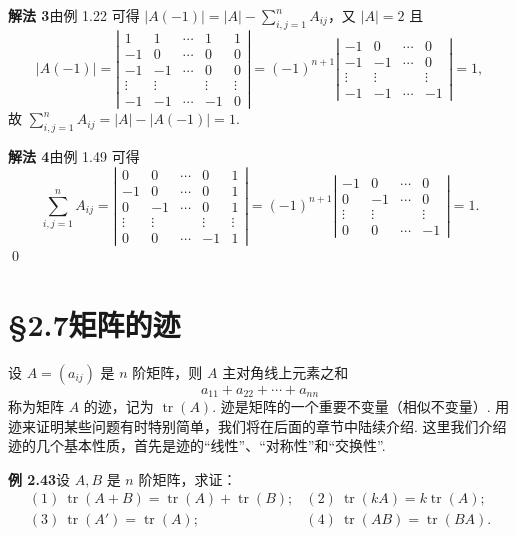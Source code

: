 \documentclass[UTF8,12pt,a4paper,fontset=fandol]{ctexart}
\begin{document}
\noindent\textbf{解法 3}\quad 由例 1.22 可得 $|A(-1)|=|A|-\sum\limits_{i,j=1}^n A_{ij}$，又 $|A|=2$ 且
\[
|A(-1)|=
\left|
\begin{array}{ccccc}
1 & 1 & \cdots & 1 & 1\\
-1 & 0 & \cdots & 0 & 0\\
-1 & -1 & \cdots & 0 & 0\\
\vdots & \vdots & & \vdots & \vdots\\
-1 & -1 & \cdots & -1 & 0
\end{array}
\right|
=(-1)^{n+1}
\left|
\begin{array}{cccc}
-1 & 0 & \cdots & 0\\
-1 & -1 & \cdots & 0\\
\vdots & \vdots & & \vdots\\
-1 & -1 & \cdots & -1
\end{array}
\right|
=1,
\]
故 $\sum\limits_{i,j=1}^n A_{ij}=|A|-|A(-1)|=1$.

\noindent\textbf{解法 4}\quad 由例 1.49 可得
\[
\sum_{i,j=1}^n A_{ij}=
\left|
\begin{array}{ccccc}
0 & 0 & \cdots & 0 & 1\\
-1 & 0 & \cdots & 0 & 1\\
0 & -1 & \cdots & 0 & 1\\
\vdots & \vdots & & \vdots & \vdots\\
0 & 0 & \cdots & -1 & 1
\end{array}
\right|
=(-1)^{n+1}
\left|
\begin{array}{cccc}
-1 & 0 & \cdots & 0\\
0 & -1 & \cdots & 0\\
\vdots & \vdots & & \vdots\\
0 & 0 & \cdots & -1
\end{array}
\right|
=1.
\]
\qed

\section*{§2.7\quad 矩阵的迹}

设 $A=(a_{ij})$ 是 $n$ 阶矩阵，则 $A$ 主对角线上元素之和
\[
a_{11}+a_{22}+\cdots+a_{nn}
\]
称为矩阵 $A$ 的迹，记为 $\operatorname{tr}(A)$. 迹是矩阵的一个重要不变量（相似不变量）. 用迹来证明某些问题有时特别简单，我们将在后面的章节中陆续介绍. 这里我们介绍迹的几个基本性质，首先是迹的“线性”、“对称性”和“交换性”.

\noindent\textbf{例 2.43}\quad 设 $A,B$ 是 $n$ 阶矩阵，求证：
\[
\begin{array}{ll}
(1)\ \operatorname{tr}(A+B)=\operatorname{tr}(A)+\operatorname{tr}(B); &
(2)\ \operatorname{tr}(kA)=k\operatorname{tr}(A);\\
(3)\ \operatorname{tr}(A')=\operatorname{tr}(A); &
(4)\ \operatorname{tr}(AB)=\operatorname{tr}(BA).
\end{array}
\]
\end{document}
